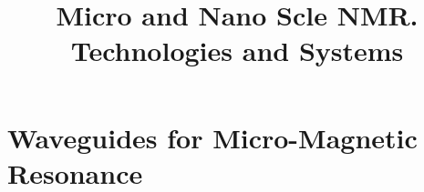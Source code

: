\documentclass[]{book}
\title{Micro and Nano Scle NMR. Technologies and Systems}
\begin{document}
	\maketitle
	
	\chapter{Waveguides for Micro-Magnetic Resonance}
	
	
	
	
	
	
	
	
	
\end{document}
